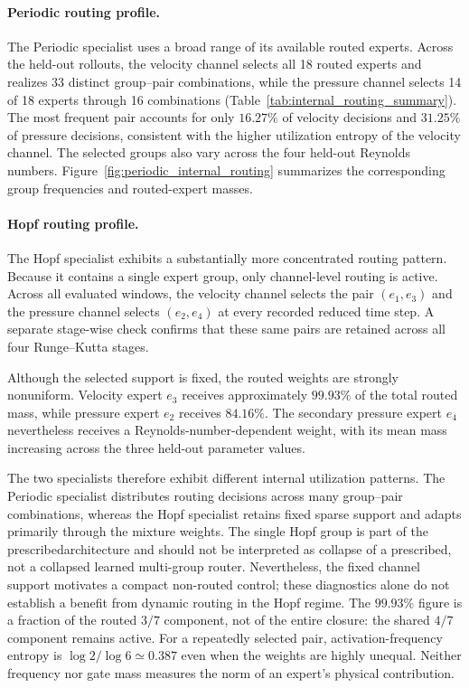 \documentclass{article}
\providecommand{\DIFaddtex}[1]{{\protect\color{blue} \sf #1}} %
\providecommand{\DIFdeltex}[1]{{\protect\color{red} \scriptsize #1}} %
\providecommand{\DIFaddbegin}{} %
\providecommand{\DIFaddend}{} %
\providecommand{\DIFdelbegin}{} %
\providecommand{\DIFdelend}{} %
\providecommand{\DIFadd}[1]{\texorpdfstring{\DIFaddtex{#1}}{#1}} %
\providecommand{\DIFdel}[1]{\texorpdfstring{\DIFdeltex{#1}}{}} %
\providecommand{\DIFscaledelfig}{0.5}
\newlength{\DIFdelgraphicswidth} %
\newlength{\DIFdelgraphicsheight} %
\providecommand{\DIFaddincludegraphics}[2][]{{\color{blue}\fbox{\DIFOincludegraphics[#1]{#2}}}} %
\providecommand{\DIFdelincludegraphics}[2][]{%
\sbox{\DIFdelgraphicsbox}{\DIFOincludegraphics[#1]{#2}}%
\settoboxwidth{\DIFdelgraphicswidth}{\DIFdelgraphicsbox} %
\settoboxtotalheight{\DIFdelgraphicsheight}{\DIFdelgraphicsbox} %
\scalebox{\DIFscaledelfig}{%
\parbox[b]{\DIFdelgraphicswidth}{\usebox{\DIFdelgraphicsbox}\\[-\baselineskip] \rule{\DIFdelgraphicswidth}{0em}}\llap{\resizebox{\DIFdelgraphicswidth}{\DIFdelgraphicsheight}{%
\setlength{\unitlength}{\DIFdelgraphicswidth}%
\begin{picture}(1,1)%
\thicklines\linethickness{2pt} %
{\color[rgb]{1,0,0}\put(0,0){\framebox(1,1){}}}%
{\color[rgb]{1,0,0}\put(0,0){\line( 1,1){1}}}%
{\color[rgb]{1,0,0}\put(0,1){\line(1,-1){1}}}%
\end{picture}%
}\hspace*{3pt}}} %
} %
\DeclareRobustCommand{\DIFaddbegin}{\DIFOaddbegin \let\includegraphics\DIFaddincludegraphics} %
\DeclareRobustCommand{\DIFaddend}{\DIFOaddend \let\includegraphics\DIFOincludegraphics} %
\DeclareRobustCommand{\DIFdelbegin}{\DIFOdelbegin \let\includegraphics\DIFdelincludegraphics} %
\DeclareRobustCommand{\DIFdelend}{\DIFOaddend \let\includegraphics\DIFOincludegraphics} %
\begin{document}
\paragraph{Periodic routing profile.}
The Periodic specialist uses a broad range of its available routed experts. Across the held-out rollouts, the velocity channel selects all 18 routed experts and realizes 33 distinct group--pair combinations, while the pressure channel selects 14 of 18 experts through 16 combinations (Table~\ref{tab:internal_routing_summary}). The most frequent pair accounts for only $16.27\%$ of velocity decisions and $31.25\%$ of pressure decisions, consistent with the higher utilization entropy of the velocity channel. The selected groups also vary across the four held-out Reynolds numbers.
Figure~\ref{fig:periodic_internal_routing} summarizes the corresponding group frequencies and routed-expert masses.



\paragraph{Hopf routing profile.}
The Hopf specialist exhibits a substantially more concentrated routing pattern. Because it contains a single expert group, only channel-level routing is active. Across all evaluated windows, the velocity channel selects the pair
$(e_1,e_3)$ and the pressure channel selects $(e_2,e_4)$ at every recorded reduced time step. A separate stage-wise check confirms that these same pairs are retained across all four Runge--Kutta stages.

Although the selected support is fixed, the routed weights are strongly nonuniform. Velocity expert $e_3$ receives approximately $99.93\%$ of the total routed mass, while pressure expert $e_2$ receives $84.16\%$. The secondary pressure expert $e_4$ nevertheless receives a Reynolds-number-dependent weight, with its mean mass increasing across the three held-out parameter values.

The two specialists therefore exhibit different internal utilization patterns. The Periodic specialist distributes routing decisions across many group--pair combinations, whereas the Hopf specialist retains fixed sparse support and adapts primarily through the mixture weights. The single Hopf group is \DIFdelbegin \DIFdel{part of the prescribedarchitecture and should not be interpreted as collapse of a }\DIFdelend \DIFaddbegin \DIFadd{prescribed, not a collapsed }\DIFaddend learned multi-group router. \DIFaddbegin \DIFadd{Nevertheless, the fixed channel support motivates a compact non-routed control; these diagnostics alone do not establish a benefit from dynamic routing in the Hopf regime. The $99.93\%$ figure is a fraction of the routed $3/7$ component, not of the entire closure: the shared $4/7$ component remains active. For a repeatedly selected pair, activation-frequency entropy is $\log 2/\log 6\simeq0.387$ even when the weights are highly unequal. Neither frequency nor gate mass measures the norm of an expert's physical contribution.
}\DIFaddend 
\end{document}
